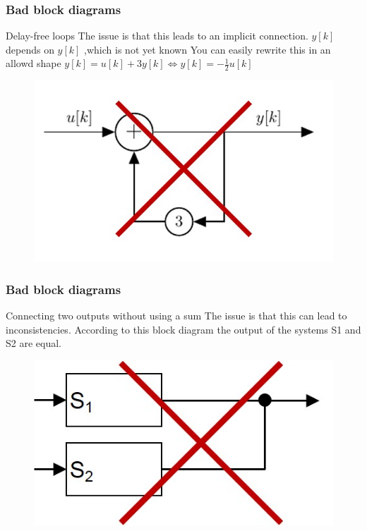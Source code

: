 \begin{frame}
	\frametitle{Bad block diagrams}

				\begin{alertblock}{Delay-free loops}
					The issue is that this leads to an implicit connection. 
					$y[k]$ depends on $y[k]$ ,which is not yet known
					You can easily rewrite this in an allowd shape
					$y[k] = u[k]  + 3 y[k] \Longleftrightarrow y[k] = -\frac{1}{2} u[k]$
					\begin{figure}
						\centering
						\includegraphics[height=0.4\textheight]{Images/discrete_time_systems_4}
					\end{figure}
				\end{alertblock}
\end{frame}
\begin{frame}
	\frametitle{Bad block diagrams}
		\begin{alertblock}{Connecting two outputs without using a sum}
			The issue is that this can lead to inconsistencies.	According to this block diagram the output of the systems S1 and S2 are equal.
			\begin{figure}
				\centering
				\includegraphics[width = 0.5\linewidth]{Images/discrete_time_systems_5}
			\end{figure}
		\end{alertblock}
\end{frame}
